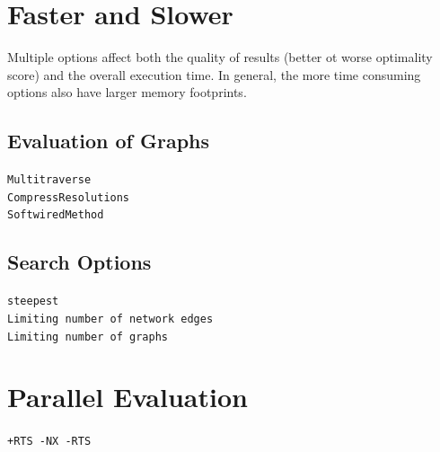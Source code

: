 \documentclass[11pt]{book}
\begin{document}
{{%
%	
	
\section{Faster and Slower}
Multiple options affect both the quality of results (better ot worse optimality score) and
the overall execution time.  In general, the more time consuming options also have larger
memory footprints.

\subsection{Evaluation of Graphs}
	\texttt{Multitraverse}\\
	\texttt{CompressResolutions}\\
	\texttt{SoftwiredMethod}\\

\subsection{Search Options}
	\texttt{steepest}\\
	\texttt{Limiting number of network edges}\\
	\texttt{Limiting number of graphs}
	
\section{Parallel Evaluation}
	\texttt{+RTS -NX -RTS}
	
}}
\end{document}
